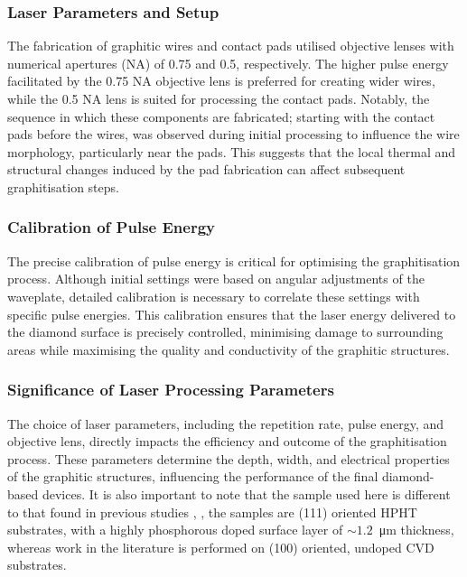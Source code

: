 \begin{refsection}
\subsubsection{Laser Parameters and Setup} 
The fabrication of graphitic wires and contact pads utilised objective lenses with numerical apertures (NA) of 0.75 and 0.5, respectively. The higher pulse energy facilitated by the 0.75 NA objective lens is preferred for creating wider wires, while the 0.5 NA lens is suited for processing the contact pads. Notably, the sequence in which these components are fabricated; starting with the contact pads before the wires, was observed during initial processing to influence the wire morphology, particularly near the pads. This suggests that the local thermal and structural changes induced by the pad fabrication can affect subsequent graphitisation steps.

\subsubsection{Calibration of Pulse Energy} 
The precise calibration of pulse energy is critical for optimising the graphitisation process. Although initial settings were based on angular adjustments of the waveplate, detailed calibration is necessary to correlate these settings with specific pulse energies. This calibration ensures that the laser energy delivered to the diamond surface is precisely controlled, minimising damage to surrounding areas while maximising the quality and conductivity of the graphitic structures.

\subsubsection{Significance of Laser Processing Parameters} 
\label{subsubsec:significance_of_laser_processing_parameters}
The choice of laser parameters, including the repetition rate, pulse energy, and objective lens, directly impacts the efficiency and outcome of the graphitisation process. These parameters determine the depth, width, and electrical properties of the graphitic structures, influencing the performance of the final diamond-based devices. It is also important to note that the sample used here is different to that found in previous studies \cite{sun2014}, \cite{salter2024}, the samples are \hkl(111) oriented HPHT substrates, with a highly phosphorous doped surface layer of $\sim1.2$~\si{\micro\metre} thickness, whereas work in the literature is performed on \hkl(100) oriented, undoped CVD substrates.


\end{refsection}
